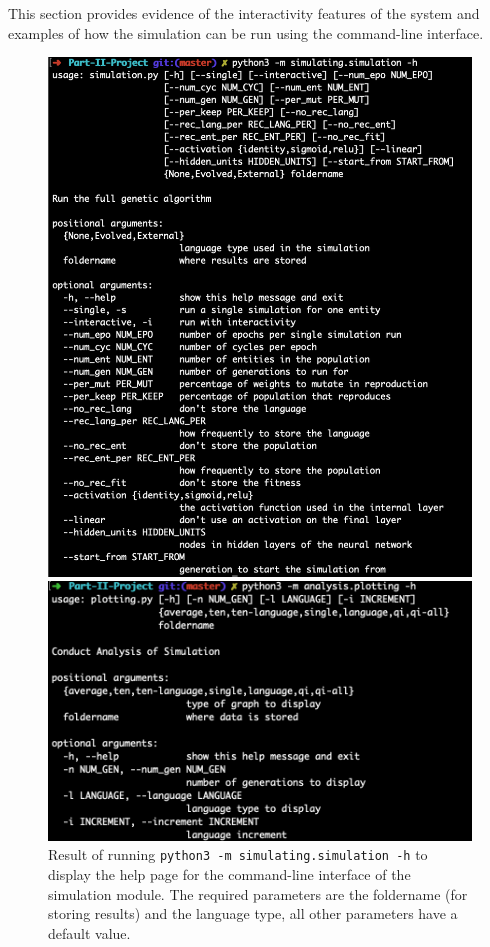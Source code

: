 \documentclass[12pt,a4paper]{report}
\begin{document}
This section provides evidence of the interactivity features of the system and examples of how the simulation can be run using the command-line interface.

\begin{figure}[t]
   \centering
   \begin{minipage}{0.49\textwidth}
          \centering
          \captionsetup{width=.9\linewidth}
          \includegraphics[width=1.\linewidth]{figs/commandline}
          \caption{Result of running \texttt{python3 -m simulating.simulation -h} to display the help page for the command-line interface of the simulation module. The required parameters are the foldername (for storing results) and the language type, all other parameters have a default value.}
      \label{fig:commandline}
   \end{minipage}
   \begin{minipage}{0.49\textwidth}
          \centering
          \captionsetup{width=.9\linewidth}
          \includegraphics[width=1.\linewidth]{figs/commandline2}

\end{minipage}
\end{figure}
\end{document}
